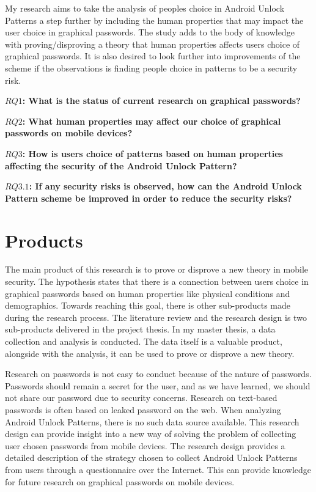   My research aims to take the analysis of peoples choice in Android Unlock Patterns a step further by including the human properties that may impact the user choice in graphical passwords. The study adds to the body of knowledge with proving/disproving a theory that human properties affects users choice of graphical passwords. It is also desired to look further into improvements of the scheme if the observations is finding people choice in patterns to be a security risk. 

  {\bf $RQ1$: What is the status of current research on graphical passwords?}

  {\bf $RQ2$: What human properties may affect our choice of graphical passwords on mobile devices?}

  {\bf $RQ3$: How is users choice of patterns based on human properties affecting the security of the Android Unlock Pattern?}

  {\bf $RQ3.1$: If any security risks is observed, how can the Android Unlock Pattern scheme be improved in order to reduce the security risks?} 
  
  \section*{Products}

  The main product of this research is to prove or disprove a new theory in mobile security. The hypothesis states that there is a connection between users choice in graphical passwords based on human properties like physical conditions and demographics. Towards reaching this goal, there is other sub-products made during the research process. The literature review and the research design is two sub-products delivered in the project thesis. In my master thesis, a data collection and analysis is conducted. The data itself is a valuable product, alongside with the analysis, it can be used to prove or disprove a new theory.

  Research on passwords is not easy to conduct because of the nature of passwords. Passwords should remain a secret for the user, and as we have learned, we should not share our password due to security concerns. Research on text-based passwords is often based on leaked password on the web. When analyzing Android Unlock Patterns, there is no such data source available. This research design can provide insight into a new way of solving the problem of collecting user chosen passwords from mobile devices. The research design provides a detailed description of the strategy chosen to collect Android Unlock Patterns from users through a questionnaire over the Internet. This can provide knowledge for future research on graphical passwords on mobile devices. 
  
